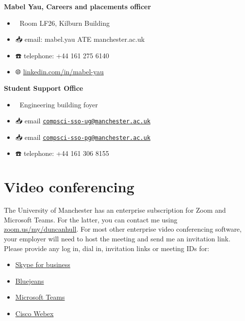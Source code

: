 \documentclass[
  12pt,
]{book}
\providecommand{\tightlist}{%
  \setlength{\itemsep}{0pt}\setlength{\parskip}{0pt}}
\begin{document}
\textbf{Mabel Yau, Careers and placements officer} 👩‍💻

\begin{itemize}
\tightlist
\item
  🏢 Room LF26, Kilburn Building
\item
  📥 email: mabel.yau ATE manchester.ac.uk
\item
  ☎️ telephone: +44 161 275 6140
\item
  🌐 \href{https://uk.linkedin.com/in/mabel-yau}{linkedin.com/in/mabel-yau}
\end{itemize}

\textbf{Student Support Office } 👨‍👩‍👧‍👧

\begin{itemize}
\tightlist
\item
  🏢 Engineering building foyer
\item
  📥 email \href{mailto:compsci-sso-ug@manchester.ac.uk}{\nolinkurl{compsci-sso-ug@manchester.ac.uk}}
\item
  📥 email \href{mailto:compsci-sso-pg@manchester.ac.uk}{\nolinkurl{compsci-sso-pg@manchester.ac.uk}}
\item
  ☎️ telephone: +44 161 306 8155
\end{itemize}

\hypertarget{video-conferencing}{%
\section{Video conferencing}\label{video-conferencing}}

The University of Manchester has an enterprise subscription for Zoom and Microsoft Teams. For the latter, you can contact me using \href{https://zoom.us/my/duncanhull}{zoom.us/my/duncanhull}. For most other enterprise video conferencing software, your employer will need to host the meeting and send me an invitation link. Please provide any log in, dial in, invitation links or meeting IDs for:

\begin{itemize}
\tightlist
\item
  \href{https://en.wikipedia.org/wiki/Skype_for_Business}{Skype for business}
\item
  \href{https://en.wikipedia.org/wiki/BlueJeans}{Bluejeans}
\item
  \href{https://en.wikipedia.org/wiki/Microsoft_Teams}{Microsoft Teams}
\item
  \href{https://en.wikipedia.org/wiki/Cisco_Webex}{Cisco Webex}
\end{itemize}
\end{document}
